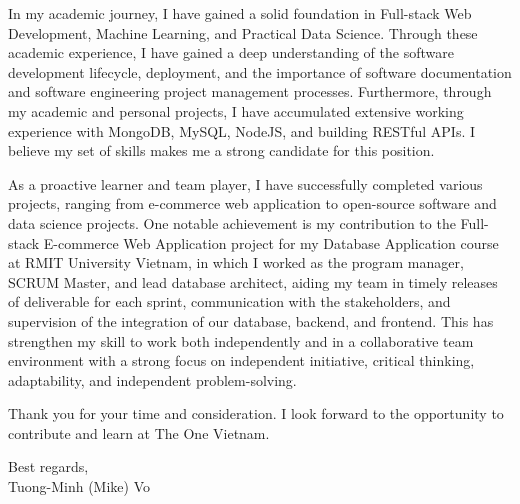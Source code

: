 \documentclass[a4paper,11pt]{article}
\newcommand{\p}[1]{#1\\\vspace{6pt}}
\begin{document}
\p{In my academic journey, I have gained a solid foundation in Full-stack Web Development, Machine Learning, and Practical Data Science. Through these academic experience, I have gained a deep understanding of the software development lifecycle, deployment, and the importance of software documentation and software engineering project management processes. Furthermore, through my academic and personal projects, I have accumulated extensive working experience with MongoDB, MySQL, NodeJS, and building RESTful APIs. I believe my set of skills makes me a strong candidate for this position.}

\p{As a proactive learner and team player, I have successfully completed various projects, ranging from e-commerce web application to open-source software and data science projects. One notable achievement is my contribution to the Full-stack E-commerce Web Application project for my Database Application course at RMIT University Vietnam, in which I worked as the program manager, SCRUM Master, and lead database architect, aiding my team in timely releases of deliverable for each sprint, communication with the stakeholders, and supervision of the integration of our database, backend, and frontend. This has strengthen my skill to work both independently and in a collaborative team environment with a strong focus on independent initiative, critical thinking, adaptability, and independent problem-solving.}

\p{Thank you for your time and consideration. I look forward to the opportunity to contribute and learn at The One Vietnam.}

\p{Best regards,\\
Tuong-Minh (Mike) Vo}
%
\end{document}
